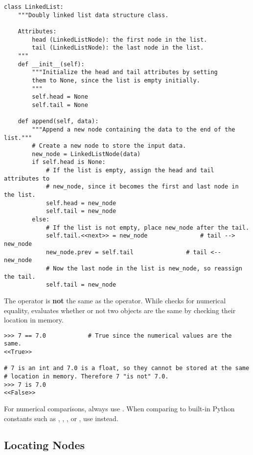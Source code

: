 \begin{lstlisting}
class LinkedList:
    """Doubly linked list data structure class.

    Attributes:
        head (LinkedListNode): the first node in the list.
        tail (LinkedListNode): the last node in the list.
    """
    def __init__(self):
        """Initialize the head and tail attributes by setting
        them to None, since the list is empty initially.
        """
        self.head = None
        self.tail = None

    def append(self, data):
        """Append a new node containing the data to the end of the list."""
        # Create a new node to store the input data.
        new_node = LinkedListNode(data)
        if self.head is None:
            # If the list is empty, assign the head and tail attributes to
            # new_node, since it becomes the first and last node in the list.
            self.head = new_node
            self.tail = new_node
        else:
            # If the list is not empty, place new_node after the tail.
            self.tail.<<next>> = new_node               # tail --> new_node
            new_node.prev = self.tail               # tail <-- new_node
            # Now the last node in the list is new_node, so reassign the tail.
            self.tail = new_node
\end{lstlisting}

\begin{warn} %
The  operator is \textbf{not} the same as the \li{==} operator.
While \li{==} checks for numerical equality,  evaluates whether or not two objects are the same by checking their location in memory.

\begin{lstlisting}
>>> 7 == 7.0            # True since the numerical values are the same.
<<True>>

# 7 is an int and 7.0 is a float, so they cannot be stored at the same
# location in memory. Therefore 7 "is not" 7.0.
>>> 7 is 7.0
<<False>>
\end{lstlisting}

For numerical comparisons, always use \li{==}.
When comparing to built-in Python constants such as , , , or , use  instead.
\end{warn}

\subsection*{Locating Nodes} %

